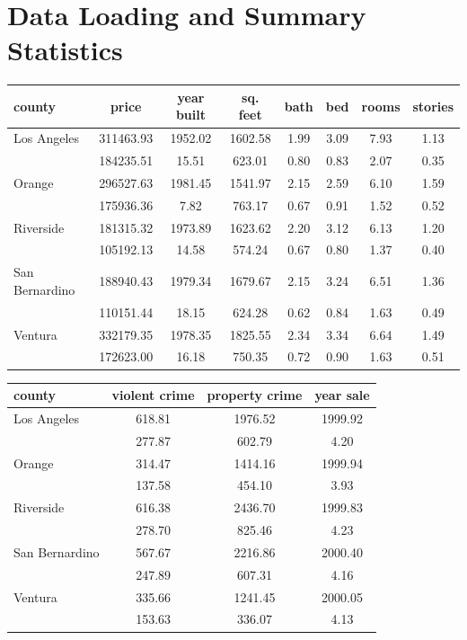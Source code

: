 \documentclass[12pt,a4paper]{article}
\begin{document}
\section{Data Loading and Summary Statistics}

\begin{center}
\begin{tabular}{lccccccc}
\hline
\hline
county &      price &  year built &  sq. feet &  bath &   bed &  rooms &  stories \\
\hline
\hline
Los Angeles     &  311463.93 &     1952.02 &  1602.58 &  1.99 &  3.09 &   7.93 &     1.13 \\
     &  184235.51 &       15.51 &   623.01 &  0.80 &  0.83 &   2.07 &     0.35  \\
 \hline
Orange    &  296527.63 &     1981.45 &  1541.97 &  2.15 &  2.59 &   6.10 &     1.59 \\
     &  175936.36 &        7.82 &   763.17 &  0.67 &  0.91 &   1.52 &     0.52  \\
  \hline
Riverside     &  181315.32 &     1973.89 &  1623.62 &  2.20 &  3.12 &   6.13 &     1.20 \\
 & 105192.13 &       14.58 &   574.24 &  0.67 &  0.80 &   1.37 &     0.40 \\
  \hline
San Bernardino     &  188940.43 &     1979.34 &  1679.67 &  2.15 &  3.24 &   6.51 &     1.36 \\
    &  110151.44 &       18.15 &   624.28 &  0.62 &  0.84 &   1.63 &     0.49  \\
 \hline
Ventura    &  332179.35 &     1978.35 &  1825.55 &  2.34 &  3.34 &   6.64 &     1.49 \\
&  172623.00 &       16.18 &   750.35 &  0.72 &  0.90 &   1.63 &     0.51 \\
\hline
\hline
\end{tabular}
\vspace{1cm}

\begin{tabular}{lccc}
\hline
\hline
county &      violent crime &  property crime &  year sale \\
\hline
\hline
Los Angeles    &         618.81 &         1976.52 &    1999.92 \\
&         277.87 &          602.79 &       4.20\\
 \hline
Orange     &         314.47 &         1414.16 &    1999.94 \\
&         137.58 &          454.10 &       3.93\\
 \hline
Riverside   &         616.38 &         2436.70 &    1999.83 \\
&         278.70 &          825.46 &       4.23 \\
 \hline
San Bernardino       &         567.67 &         2216.86 &    2000.40 \\
&         247.89 &          607.31 &       4.16 \\
 \hline
Ventura    &         335.66 &         1241.45 &    2000.05 \\
 &         153.63 &          336.07 &       4.13\\
 \hline
\hline
\end{tabular}
\vspace{0.4cm}


\end{center}
\end{document}
